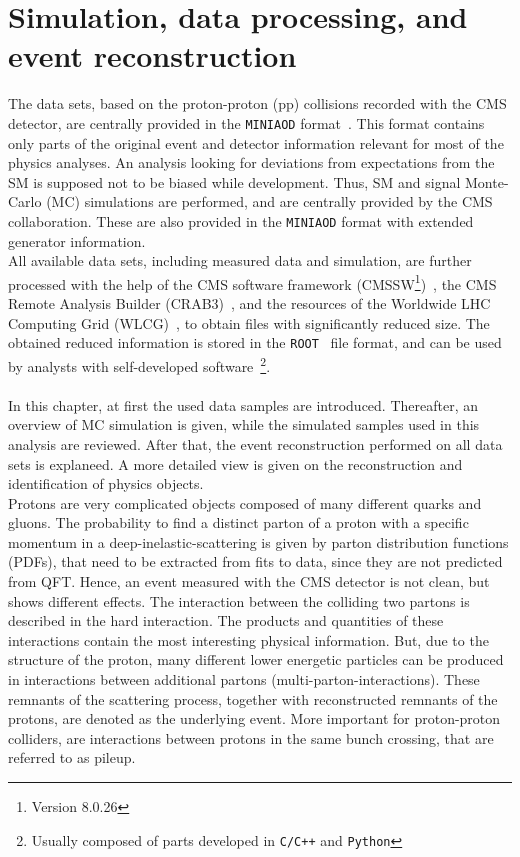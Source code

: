 \chapter{Simulation, data processing, and event reconstruction}\label{chap:reco}
The data sets, based on the proton-proton (pp) collisions recorded with the CMS detector, are centrally provided in the \texttt{MINIAOD} format~\cite{MiniAOD}. This format contains only parts of the original event and detector information relevant for most of the physics analyses. An analysis looking for deviations from expectations from the SM is supposed not to be biased while development. Thus, SM and signal Monte-Carlo (MC) simulations are performed, and are centrally provided by the CMS collaboration. These are also provided in the \texttt{MINIAOD} format with extended generator information.\\
All available data sets, including measured data and simulation, are further processed with the help of the CMS software framework (CMSSW\footnote{Version 8.0.26})~\cite{CMSSW}, the CMS Remote Analysis Builder (CRAB3)~\cite{CRAB}, and the resources of the Worldwide LHC Computing Grid (WLCG)~\cite{Grid}, to obtain files with significantly reduced size. The obtained reduced information is stored in the \texttt{ROOT}~\cite{ROOT} file format, and can be used by analysts with self-developed software~\footnote{Usually composed of parts developed in \texttt{C/C++} and \texttt{Python}}.\\
\\
In this chapter, at first the used data samples are introduced. Thereafter, an overview of MC simulation is given, while the simulated samples used in this analysis are reviewed. After that, the event reconstruction performed on all data sets is explaneed. A more detailed view is given on the reconstruction and identification of physics objects.\\

Protons are very complicated objects composed of many different quarks and gluons. The probability to find a distinct parton of a proton with a specific momentum in a deep-inelastic-scattering is given by parton distribution functions (PDFs)\cite{PDF}, that need to be extracted from fits to data, since they are not predicted from QFT. Hence, an event measured with the CMS detector is not clean, but shows different effects. The interaction between the colliding two partons is described in the hard interaction. The products and quantities of these interactions contain the most interesting physical information. But, due to the structure of the proton, many different lower energetic particles can be produced in interactions between additional partons (multi-parton-interactions). These remnants of the scattering process, together with reconstructed remnants of the protons, are denoted as the underlying event. More important for proton-proton colliders, are interactions between protons in the same bunch crossing, that are referred to as pileup.

